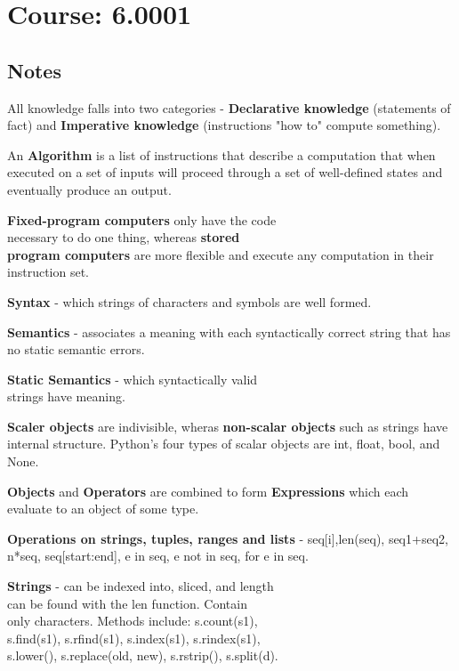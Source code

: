 \twocolumn
\chapter{Course: 6.0001}
\section{Notes}


All knowledge falls into two categories -  \textbf{Declarative knowledge} (statements of fact) and \textbf{Imperative knowledge} (instructions "how to" compute something). 

An \textbf{Algorithm} is a list of instructions that describe a computation that when executed on a set of inputs will proceed through a set of well-defined states and eventually produce an output.

\textbf{Fixed-program computers} only have the code \\ necessary to do one thing, whereas \textbf{stored \\ program computers} are more flexible and execute any computation in their instruction set.

\textbf{Syntax} - which strings of characters and symbols are well formed. 

\textbf{Semantics} - associates a meaning with each syntactically correct string that has no static semantic errors. 

\textbf{Static Semantics} - which syntactically valid \\ strings have meaning. 

\textbf{Scaler objects} are indivisible, wheras \textbf{non-scalar objects} such as strings have internal structure. Python's four types of scalar objects are int, float, bool, and None. 

\textbf{Objects} and \textbf{Operators} are combined to form \textbf{Expressions} which each evaluate to an object of some type.

\textbf{Operations on strings, tuples, ranges and lists} - seq[i],len(seq), seq1+seq2, n*seq, seq[start:end], e in seq, e not in seq, for e in seq.

\textbf{Strings} - can be indexed into, sliced, and length \\ can be found with the len function. Contain \\ only characters. Methods include: s.count(s1), \\ s.find(s1), s.rfind(s1), s.index(s1), s.rindex(s1), \\ s.lower(), s.replace(old, new), s.rstrip(), s.split(d).

